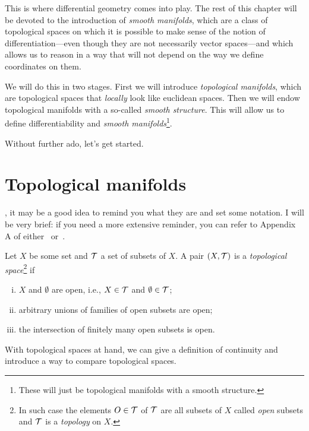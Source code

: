 This is where differential geometry comes into play.
The rest of this chapter will be devoted to the introduction of \emph{smooth manifolds}, which are a class of topological spaces on which it is possible to make sense of the notion of differentiation---even though they are not necessarily vector spaces---and which allows us to reason in a way that will not depend on the way we define coordinates on them.

We will do this in two stages.
First we will introduce \emph{topological manifolds}, which are topological spaces that \emph{locally} look like euclidean spaces.
Then we will endow topological manifolds with a so-called \emph{smooth structure}.
This will allow us to define differentiability and \emph{smooth manifolds}\footnote{These will just be topological manifolds with a smooth structure.}.

Without further ado, let's get started.

\section{Topological manifolds}\label{sec:top_manifolds}

, it may be a good idea to remind you what they are and set some notation.
I will be very brief: if you need a more extensive reminder, you can refer to Appendix A of either~\cite{book:tu} or~\cite{book:lee}.

\begin{definition}
  Let $X$ be some set and $\mathcal{T}$ a set of subsets of $X$.
  A pair $(X, \mathcal{T})$ is a \emph{topological space}\footnote{In such case the elements $O\in\mathcal{T}$ of $\mathcal{T}$ are all subsets of $X$ called \emph{open} subsets and $\mathcal{T}$ is a \emph{topology} on $X$.} if
  \begin{enumerate}[(i)]
    \item $X$ and $\emptyset$ are open, i.e., $X\in \mathcal{T}$ and $\emptyset\in\mathcal{T}$;
    \item arbitrary unions of families of open subsets are open;
    \item the intersection of finitely many open subsets is open.
  \end{enumerate}
\end{definition}

With topological spaces at hand, we can give a definition of continuity and introduce a way to compare topological spaces.

